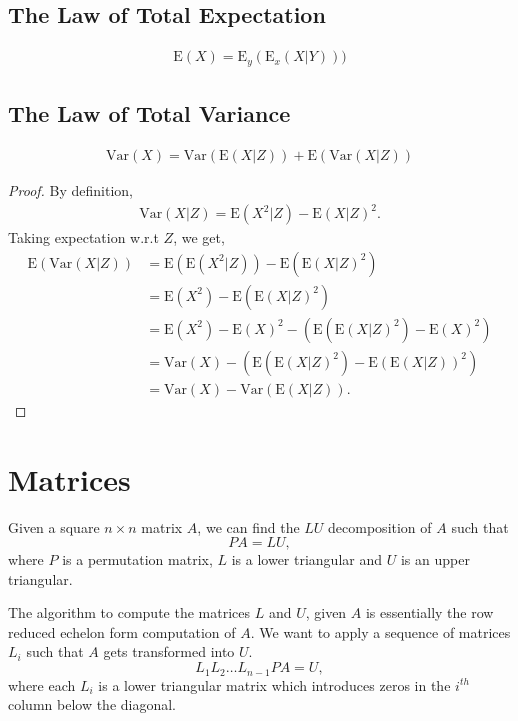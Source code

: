 \documentclass{amsart}
\theoremstyle{plain}
\numberwithin{equation}{section}
\begin{document}
\subsection{The Law of Total Expectation}
\begin{align*}
\mathrm{E}(X) = \mathrm{E}_y(\mathrm{E}_x(X|Y)))
\end{align*}

\subsection{The Law of Total Variance}
\begin{align*}
\mathrm{Var}(X) = \mathrm{Var}(\mathrm{E}(X|Z))+
\mathrm{E}(\mathrm{Var}(X|Z)) 
\end{align*}

\begin{proof}
By definition,
\begin{align*}
\mathrm{Var}(X|Z) = \mathrm{E}(X^2|Z) - \mathrm{E}(X|Z)^2.
\end{align*}
Taking expectation w.r.t $Z$, we get,
\begin{align*}
\mathrm{E}(\mathrm{Var}(X|Z)) &= \mathrm{E}(\mathrm{E}(X^2|Z)) - \mathrm{E}(\mathrm{E}(X|Z)^2)\\
&= \mathrm{E}(X^2) - \mathrm{E}(\mathrm{E}(X|Z)^2)\\
&= \mathrm{E}(X^2) - \mathrm{E}(X)^2 - \left(\mathrm{E}(\mathrm{E}(X|Z)^2)-\mathrm{E}(X)^2\right)\\
&= \mathrm{Var}(X) - \left(\mathrm{E}(\mathrm{E}(X|Z)^2)-\mathrm{E}(\mathrm{E}(X|Z))^2\right)\\
&= \mathrm{Var}(X) - \mathrm{Var}(\mathrm{E}(X|Z)).
\end{align*}


\end{proof}
\section{Matrices}
Given a square $n \times n$ matrix $A$, we can find the $LU$ decomposition 
of $A$ such that 
\begin{equation}
PA = LU,
\label{eq:LU}
\end{equation}
where $P$ is a permutation matrix, $L$ is a lower triangular
and $U$ is an upper triangular.

The algorithm to compute the matrices $L$ and $U$, given $A$ is 
essentially the row reduced echelon form computation of $A$. 
We want to apply a sequence of matrices $L_i$ such that 
$A$ gets transformed into $U$. 
\begin{equation}
L_1 L_2 \ldots L_{n-1} PA = U,
\label{}
\end{equation}
where each $L_i$ is a lower triangular matrix
which introduces zeros in the $i^{th}$ column
below the diagonal. 
\end{document}
